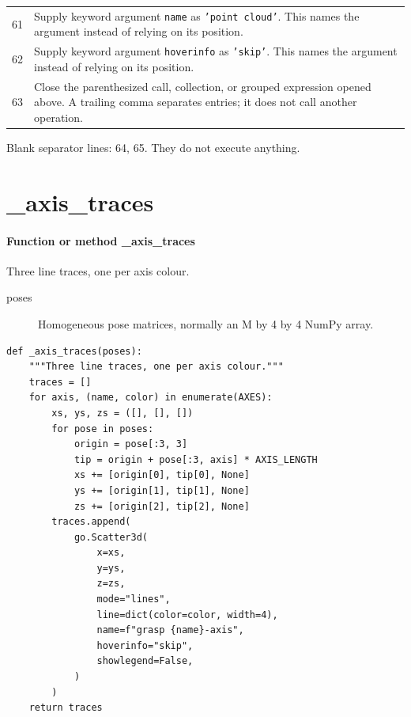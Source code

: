 \documentclass[11pt,a4paper]{book}
\begin{document}
\begin{longtable}{r p{}}
61 & Supply keyword argument \texttt{name} as \texttt{'point cloud'}. This names the argument instead of relying on its position. \\

62 & Supply keyword argument \texttt{hoverinfo} as \texttt{'skip'}. This names the argument instead of relying on its position. \\

63 & Close the parenthesized call, collection, or grouped expression opened above. A trailing comma separates entries; it does not call another operation. \\

\end{longtable}

Blank separator lines: 64, 65. They do not execute anything.

\section{\_axis\_traces}

\paragraph{Function or method \_axis\_traces}
Three line traces, one per axis colour.

\begin{description}
\item[poses] Homogeneous pose matrices, normally an M by 4 by 4 NumPy array.
\end{description}

\begin{lstlisting}[firstnumber=66]
def _axis_traces(poses):
    """Three line traces, one per axis colour."""
    traces = []
    for axis, (name, color) in enumerate(AXES):
        xs, ys, zs = ([], [], [])
        for pose in poses:
            origin = pose[:3, 3]
            tip = origin + pose[:3, axis] * AXIS_LENGTH
            xs += [origin[0], tip[0], None]
            ys += [origin[1], tip[1], None]
            zs += [origin[2], tip[2], None]
        traces.append(
            go.Scatter3d(
                x=xs,
                y=ys,
                z=zs,
                mode="lines",
                line=dict(color=color, width=4),
                name=f"grasp {name}-axis",
                hoverinfo="skip",
                showlegend=False,
            )
        )
    return traces


\end{lstlisting}
\end{document}
